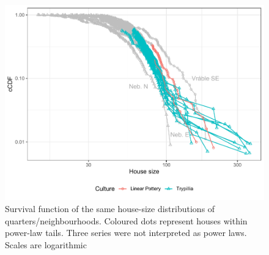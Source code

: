 \documentclass[
  12pt,
]{book}
\begin{document}
\begin{figure}

{\centering \includegraphics[width=0.9\linewidth]{bookdown-demo_files/figure-latex/06-quart-tails-1} 

}

\caption{Survival function of the same house-size distributions of quarters/neighbourhoods. Coloured dots represent houses within power-law tails. Three series were not interpreted as power laws. Scales are logarithmic}\label{fig:06-quart-tails}
\end{figure}
\end{document}
